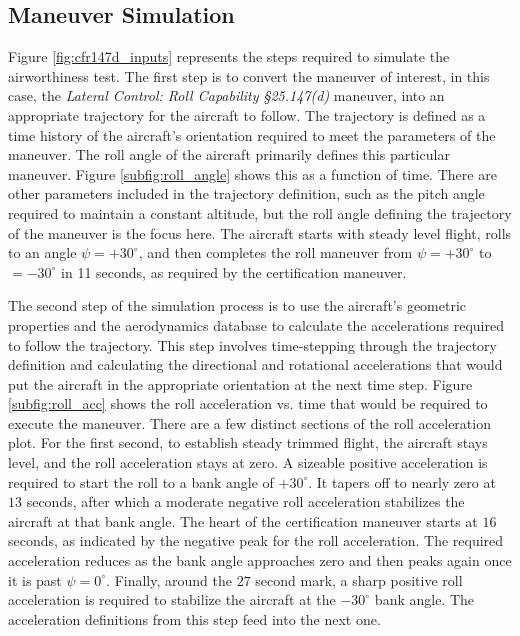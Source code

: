 \subsection{Maneuver Simulation}

Figure \ref{fig:cfr147d_inputs} represents the steps required to simulate the airworthiness test. 
The first step is to convert the maneuver of interest, in this case, the \textit{Lateral Control: Roll Capability \S 25.147(d)} maneuver, into an appropriate trajectory for the aircraft to follow. 
The trajectory is defined as a time history of the aircraft's orientation required to meet the parameters of the maneuver. 
The roll angle of the aircraft primarily defines this particular maneuver.
Figure \ref{subfig:roll_angle} shows this as a function of time.
There are other parameters included in the trajectory definition, such as the pitch angle required to maintain a constant altitude, but the roll angle defining the trajectory of the maneuver is the focus here.
The aircraft starts with steady level flight, rolls to an angle $\psi = +30^\circ$, and then completes the roll maneuver from $\psi = +30^\circ$ to $=-30^\circ$ in 11 seconds, as required by the certification maneuver. 

The second step of the simulation process is to use the aircraft's geometric properties and the aerodynamics database to calculate the accelerations required to follow the trajectory.
This step involves time-stepping through the trajectory definition and calculating the directional and rotational accelerations that would put the aircraft in the appropriate orientation at the next time step. 
Figure \ref{subfig:roll_acc} shows the roll acceleration vs. time that would be required to execute the maneuver.
There are a few distinct sections of the roll acceleration plot. 
For the first second, to establish steady trimmed flight, the aircraft stays level, and the roll acceleration stays at zero.
A sizeable positive acceleration is required to start the roll to a bank angle of $+30^\circ$. 
It tapers off to nearly zero at $13$ seconds, after which a moderate negative roll acceleration stabilizes the aircraft at that bank angle. 
The heart of the certification maneuver starts at $16$ seconds, as indicated by the negative peak for the roll acceleration.
The required acceleration reduces as the bank angle approaches zero and then peaks again once it is past $\psi=0^\circ$.
Finally, around the $27$ second mark, a sharp positive roll acceleration is required to stabilize the aircraft at the $-30^\circ$ bank angle. 
The acceleration definitions from this step feed into the next one.

